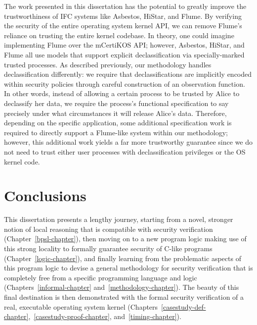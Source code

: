 The work presented in this dissertation has the potential to
greatly improve the trustworthiness of IFC systems like
Asbestos, HiStar, and Flume. By verifying the security of
the entire operating system kernel API, we can remove Flume's
reliance on trusting the entire kernel codebase. In theory,
one could imagine implementing Flume over the mCertiKOS API;
however, Asbestos, HiStar, and Flume all use models that
support explicit declassification via specially-marked
trusted processes. As described previously,
our methodology handles declassification differently: we
require that declassifications are implicitly encoded within security
policies through careful construction of an observation function.
In other words, instead of allowing a certain process to be
trusted by Alice to declassify her data, we require the
process's functional specification to say precisely
under what circumstances it will release Alice's data.
Therefore, depending on the specific application, some additional
specification work is required to directly support a Flume-like 
system within our methodology; however, this additional work
yields a far more trustworthy guarantee since we do not need
to trust either user processes with declassification privileges
or the OS kernel code.

\section{Conclusions}
\label{concl}
This dissertation presents a lengthy journey, starting from a novel,
stronger notion of local reasoning that is compatible with
security verification (Chapter~\ref{bpsl-chapter}), then moving
on to a new program logic making use of this strong locality to
formally guarantee security of C-like programs (Chapter~\ref{logic-chapter}), 
and finally learning from the problematic aspects of this program
logic to devise a general methodology for security verification that
is completely free from a specific programming language and logic
(Chapters~\ref{informal-chapter} and~\ref{methodology-chapter}). 
The beauty of this final destination is then demonstrated with the
formal security verification of a real, executable operating system 
kernel (Chapters~\ref{casestudy-def-chapter},~\ref{casestudy-proof-chapter},
and~\ref{timing-chapter}).

